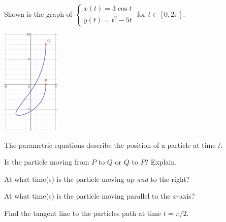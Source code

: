 \documentclass{workbook}
\begin{document}
\begin{slide}
	\question

		Shown is the graph of $\displaystyle
		\begin{cases}
			x(t)=3\cos t \\
			y(t)=t^2-5t
		\end{cases}
		$
		for $t\in[0,2\pi]$.
		\begin{center}
	\includegraphics[height=2in]{images/parametric1.png}
		\end{center}

	
	The parametric equations describe the position of a particle at time $t$.

	\begin{parts}
		\item Is the particle moving from $P$ to $Q$ or $Q$ to $P$? Explain.

		\item At what time(s) is the particle moving up \emph{and} to the right?

		\item At what time(s) is the particle moving parallel to the $x$-axis?

		\item Find the tangent line to the particles path at time $t=\pi/2$.
		
	\end{parts}
\end{slide}
\end{document}
